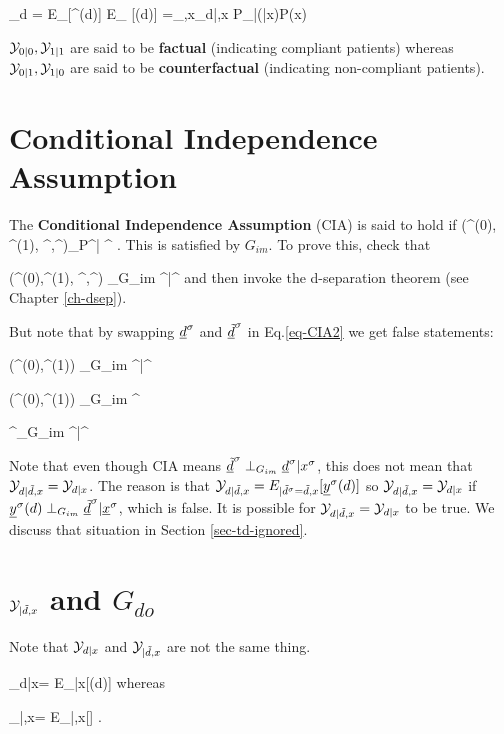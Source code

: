 \beq
\caly_{d}
=
E_{\s}[\rvy^\s(d)]
\rarrow
E_{\rvy} [\rvy(d)]
=\sum_{\td,x}\caly_{d|\td,x} P_{\rvd|\rvx}(\td|x)P(x)
\eeq


${\cal Y}_{0|0}, {\cal Y}_{1|1}$
are said to be {\bf factual} 
(indicating compliant patients)
whereas 
${\cal Y}_{0|1}, {\cal Y}_{1|0}$
are said to be {\bf counterfactual} 
(indicating non-compliant patients).


\section{Conditional Independence Assumption}

The {\bf Conditional Independence Assumption}
 (CIA)
is said to hold 
 if
\beq
(\rvy^\s(0), \rvy^\s(1),
\rvy^\s,\rvtd^\s)\perp_P\rvd^\s | \rvx^\s
\;.
\label{eq-CIA2}
\eeq
This is satisfied by $G_{im}$. To
prove this, check that

\beq
(\rvy^\s(0),\rvy^\s(1),
\rvy^\s,\rvtd^\s)
\perp_{G_{im}} \rvd^\s|\rvx^\s
\;
\eeq
and then invoke
the d-separation theorem 
(see Chapter \ref{ch-dsep}).

But note that
by swapping ${\underline{d}}^\sigma$ and
${\underline{\tilde{d}}}^\sigma$ in Eq.\ref{eq-CIA2}
we get false statements:

\beq
(\rvy^\s(0),\rvy^\s(1))
\perp_{G_{im}} \rvtd^\s|\rvx^\s
\;\;
\eeq

\beq
(\rvy^\s(0),\rvy^\s(1))
\perp_{G_{im}} \rvtd^\s
\;\;
\eeq

\beq
\rvy^\s\perp_{G_{im}} \rvtd^\s|\rvx^\s
\;\;
\eeq


Note that even though CIA means
 ${\underline{\tilde{d}}}^\sigma\perp_{G_{im}} {\underline{d}}^\sigma|x^\sigma$,
this does not mean that ${\cal Y}_{d|{\tilde{d}}, x}=
{\cal Y}_{d|x}$.
The reason is that
${\cal Y}_{d|{\tilde{d}}, x} = 
E_{|{\tilde{d}}^\sigma={\tilde{d}}, x}[{\underline{y}}^\sigma(d)]$
so ${\cal Y}_{d|{\tilde{d}}, x}=
{\cal Y}_{d|x}$
if ${\underline{y}}^\sigma(d)\perp_{G_{im}}{\underline{\tilde{d}}}^\sigma|{\underline{x}}^\sigma$,
which is false.
It is possible for
${\cal Y}_{d|{\tilde{d}}, x}=
{\cal Y}_{d|x}$ to be true.
We discuss that situation 
in Section \ref{sec-td-ignored}.



\section{${\cal Y}_{|\tilde{d},x}$ and $G_{do}$}

Note that
 ${\cal Y}_{d|x}$ and ${\cal Y}_{|{\tilde{d}},x}$
are not the same thing.

\beq
\caly_{d|x}=
E_{|x}[\rvy(d)]
\;
\eeq
whereas


\beq
\caly_{|\td,x}=
E_{|\td,x}[\rvy]
\;.
\eeq

